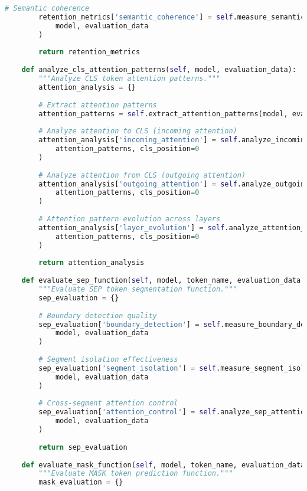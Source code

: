 \begin{lstlisting}[language=Python, caption=Comprehensive evaluation metrics framework for special token training]
        # Semantic coherence
        retention_metrics['semantic_coherence'] = self.measure_semantic_coherence(
            model, evaluation_data
        )
        
        return retention_metrics
    
    def analyze_cls_attention_patterns(self, model, evaluation_data):
        """Analyze CLS token attention patterns."""
        attention_analysis = {}
        
        # Extract attention patterns
        attention_patterns = self.extract_attention_patterns(model, evaluation_data)
        
        # Analyze attention to CLS (incoming attention)
        attention_analysis['incoming_attention'] = self.analyze_incoming_attention(
            attention_patterns, cls_position=0
        )
        
        # Analyze attention from CLS (outgoing attention)
        attention_analysis['outgoing_attention'] = self.analyze_outgoing_attention(
            attention_patterns, cls_position=0
        )
        
        # Attention pattern evolution across layers
        attention_analysis['layer_evolution'] = self.analyze_attention_evolution(
            attention_patterns, cls_position=0
        )
        
        return attention_analysis
    
    def evaluate_sep_function(self, model, token_name, evaluation_data):
        """Evaluate SEP token segmentation function."""
        sep_evaluation = {}
        
        # Boundary detection quality
        sep_evaluation['boundary_detection'] = self.measure_boundary_detection_quality(
            model, evaluation_data
        )
        
        # Segment isolation effectiveness
        sep_evaluation['segment_isolation'] = self.measure_segment_isolation(
            model, evaluation_data
        )
        
        # Cross-segment attention control
        sep_evaluation['attention_control'] = self.analyze_sep_attention_control(
            model, evaluation_data
        )
        
        return sep_evaluation
    
    def evaluate_mask_function(self, model, token_name, evaluation_data):
        """Evaluate MASK token prediction function."""
        mask_evaluation = {}
        

\end{lstlisting}
